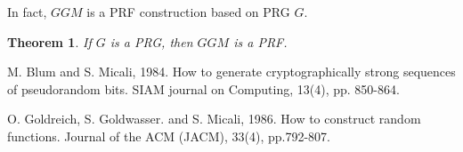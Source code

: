 \documentclass[12pt]{article}
\newtheorem{theorem}{Theorem}[section]
\theoremstyle{definition}
\begin{document}
In fact, $GGM$ is a PRF construction based on PRG $G$.
\begin{theorem}
If $G$ is a PRG, then $GGM$ is a PRF.
\end{theorem}

\begin{thebibliography}{10}

M. Blum and S. Micali, 1984. 
How to generate cryptographically strong sequences of pseudorandom bits. 
SIAM journal on Computing, 13(4), pp. 850-864.

O. Goldreich, S. Goldwasser. and S. Micali, 1986. 
How to construct random functions. 
Journal of the ACM (JACM), 33(4), pp.792-807.

\end{thebibliography}
\end{document}
